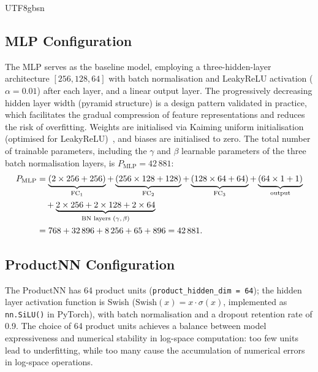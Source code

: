\documentclass[a4paper,12pt]{report}
\begin{document}
\begin{CJK}{UTF8}{gbsn}
\subsection{MLP Configuration}
\label{subsec:mlp_config}

The MLP serves as the baseline model, employing a three-hidden-layer architecture
$[256,128,64]$ with batch normalisation and LeakyReLU activation ($\alpha = 0.01$)
after each layer, and a linear output layer. The progressively decreasing hidden layer
width (pyramid structure) is a design pattern validated in practice, which facilitates
the gradual compression of feature representations and reduces the risk of overfitting.
Weights are initialised via Kaiming uniform initialisation (optimised for LeakyReLU)~\cite{he2016kaiming},
and biases are initialised to zero.
The total number of trainable parameters, including the $\gamma$ and $\beta$
learnable parameters of the three batch normalisation layers, is $P_{\text{MLP}} = 42\,881$:
\begin{align}
  P_{\text{MLP}}
    &= \underbrace{(2 \times 256 + 256)}_{\text{FC}_1}
     + \underbrace{(256 \times 128 + 128)}_{\text{FC}_2}
     + \underbrace{(128 \times 64 + 64)}_{\text{FC}_3}
     + \underbrace{(64 \times 1 + 1)}_{\text{output}} \notag \\
    &\quad + \underbrace{2 \times 256 + 2 \times 128 + 2 \times 64}_{\text{BN layers }(\gamma,\,\beta)} \notag \\
    &= 768 + 32\,896 + 8\,256 + 65 + 896 = 42\,881.
  \label{eq:mlp_params}
\end{align}

\subsection{ProductNN Configuration}
\label{subsec:productnn_config}

The ProductNN has 64 product units (\texttt{product\_hidden\_dim = 64}); the hidden
layer activation function is Swish ($\mathrm{Swish}(x) = x \cdot \sigma(x)$, implemented
as \texttt{nn.SiLU()} in PyTorch), with batch normalisation and a dropout retention rate
of 0.9. The choice of 64 product units achieves a balance between model expressiveness
and numerical stability in log-space computation: too few units lead to underfitting,
while too many cause the accumulation of numerical errors in log-space operations.


\end{CJK}
\end{document}
